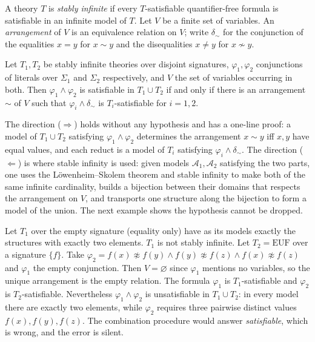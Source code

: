 \begin{definition}
\label{def:stably-infinite}
A theory $T$ is \emph{stably infinite} if every $T$-satisfiable quantifier-free formula is satisfiable in an infinite model of $T$. Let $V$ be a finite set of variables. An \emph{arrangement} of $V$ is an equivalence relation on $V$; write $\delta_{\sim}$ for the conjunction of the equalities $x=y$ for $x\sim y$ and the disequalities $x\ne y$ for $x\not\sim y$.
\end{definition}

\begin{theorem}
\label{thm:no}
 Let $T_1,T_2$ be stably infinite theories over disjoint signatures, $\varphi_1,\varphi_2$ conjunctions of literals over $\Sigma_1$ and $\Sigma_2$ respectively, and $V$ the set of variables occurring in both. Then $\varphi_1\wedge\varphi_2$ is satisfiable in $T_1\cup T_2$ if and only if there is an arrangement $\sim$ of $V$ such that $\varphi_i\wedge\delta_{\sim}$ is $T_i$-satisfiable for $i=1,2$.
\end{theorem}

The direction ($\Rightarrow$) holds without any hypothesis and has a one-line proof: a model of $T_1\cup T_2$ satisfying $\varphi_1\wedge\varphi_2$ determines the arrangement $x\sim y$ iff $x,y$ have equal values, and each reduct is a model of $T_i$ satisfying $\varphi_i\wedge\delta_{\sim}$. The direction ($\Leftarrow$) is where stable infinity is used: given models $\mathcal{A}_1,\mathcal{A}_2$ satisfying the two parts, one uses the Löwenheim--Skolem theorem and stable infinity to make both of the same infinite cardinality, builds a bijection between their domains that respects the arrangement on $V$, and transports one structure along the bijection to form a model of the union. The next example shows the hypothesis cannot be dropped.

\begin{example}
\label{ex:not-stably-infinite}
Let $T_1$ over the empty signature (equality only) have as its models exactly the structures with exactly two elements. $T_1$ is not stably infinite. Let $T_2=\mathrm{EUF}$ over a signature $\{f\}$. Take $\varphi_2=f(x)\not\approx f(y)\wedge f(y)\not\approx f(z)\wedge f(x)\not\approx f(z)$ and $\varphi_1$ the empty conjunction. Then $V=\varnothing$ since $\varphi_1$ mentions no variables, so the unique arrangement is the empty relation. The formula $\varphi_1$ is $T_1$-satisfiable and $\varphi_2$ is $T_2$-satisfiable. Nevertheless $\varphi_1\wedge\varphi_2$ is unsatisfiable in $T_1\cup T_2$: in every model there are exactly two elements, while $\varphi_2$ requires three pairwise distinct values $f(x),f(y),f(z)$. The combination procedure would answer \emph{satisfiable}, which is wrong, and the error is silent.
\end{example}

